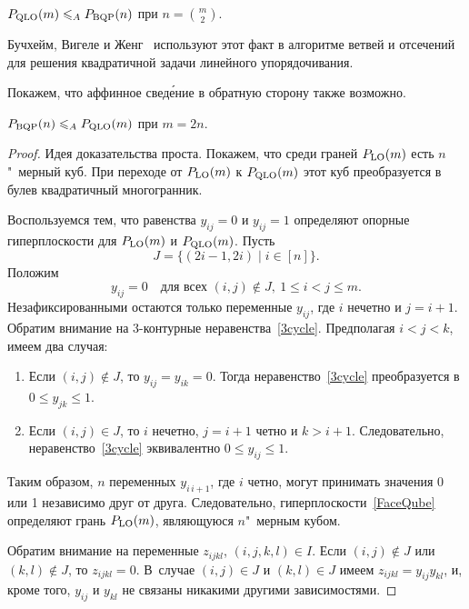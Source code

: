 \begin{theorem} 
	$P_{\textup{QLO}}(m) \leqslant_A P_{\textup{BQP}}(n)$ при $n = \binom{m}{2}$.
\end{theorem} 

Бучхейм, Вигеле и Женг~\cite{Buchheim:2010} используют этот факт в алгоритме ветвей и отсечений для решения квадратичной задачи линейного упорядочивания.

Покажем, что аффинное свед\'{е}ние в обратную сторону также возможно.

\begin{theorem}
	\label{ThBQP-QLOP}
	$P_{\textup{BQP}}(n) \leqslant_A P_{\textup{QLO}}(m)$ при $m = 2n$.
\end{theorem} 

\begin{proof}
	Идея доказательства проста.
	Покажем, что среди граней $P_{\textup{LO}}(m)$ есть $n$"~мерный куб.
	При переходе от $P_{\textup{LO}}(m)$ к $P_{\textup{QLO}}(m)$ этот куб преобразуется в булев квадратичный многогранник.
	
	Воспользуемся тем, что равенства $y_{ij} = 0$ и $y_{ij} = 1$ определяют опорные гиперплоскости для $P_{\textup{LO}}(m)$ и $P_{\textup{QLO}}(m)$.
	Пусть
	\[
	J = \{(2i-1,2i) \mid i\in[n] \}.
	\] 
	Положим 
	\begin{equation}
	\label{FaceQube}
	y_{ij} = 0 \quad \text{для всех } (i,j)\notin J, \ 1 \le i < j \le m.
	\end{equation}
	Незафиксированными остаются только переменные $y_{ij}$, где $i$ нечетно и $j = i+1$.
	Обратим внимание на 3-контурные неравенства~\eqref{3cycle}.
	Предполагая $i < j < k$, имеем два случая:
	\begin{enumerate} 
		\item Если $(i,j)\notin J$, то $y_{ij} = y_{ik} = 0$.
		Тогда неравенство~\eqref{3cycle} преобразуется в $0 \le y_{jk} \le 1$. 
		\item Если $(i,j)\in J$, то $i$ нечетно, $j = i+1$ четно и $k > i+1$.
		Следовательно, неравенство~\eqref{3cycle} эквивалентно $0 \le y_{ij} \le 1$.
	\end{enumerate} 
	Таким образом, $n$ переменных $y_{i\, i+1}$, где $i$ четно, 
	могут принимать значения 0 или 1 независимо друг от друга.
	Следовательно, гиперплоскости~\eqref{FaceQube} определяют грань $P_{\textup{LO}}(m)$, являющуюся $n$"~мерным кубом. 
	
	Обратим внимание на переменные $z_{ijkl}$, $(i,j,k,l) \in I$.
	Если $(i,j) \notin J$ или $(k,l) \notin J$, то $z_{ijkl}=0$.
	В~случае $(i,j) \in J$ и $(k,l) \in J$ имеем $z_{ijkl}=y_{ij} y_{kl}$, 
	и, кроме того, $y_{ij}$ и $y_{kl}$ не связаны никакими другими зависимостями.
	

\end{proof}
